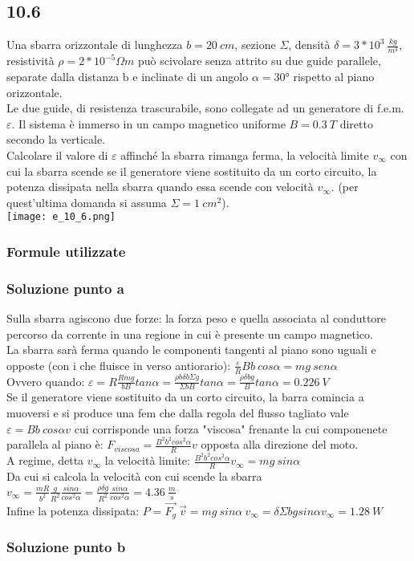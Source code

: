 \documentclass[../../main.tex]{subfiles}
\begin{document}
\subsection*{10.6}
Una sbarra orizzontale di lunghezza $b =20\ cm$, sezione $\Sigma$, densità $\delta = 3*10^3\ \frac{kg}{m^3}$, resistività $\rho = 2 * 10^{-5}\Omega m$ può scivolare senza attrito su due guide parallele, separate dalla distanza b e inclinate di un angolo $\alpha = 30°$ rispetto al piano orizzontale.\\
Le due guide, di resistenza trascurabile, sono collegate ad un generatore di f.e.m. $\varepsilon$. Il sistema è immerso in un campo magnetico uniforme $B = 0.3\ T$ diretto secondo la verticale.\\
Calcolare il valore di $\varepsilon$ affinché la sbarra rimanga ferma, la velocità limite $v_{\infty}$ con cui la sbarra scende se il generatore viene sostituito da un corto circuito, la potenza dissipata nella sbarra quando essa scende con velocità $v_{\infty}$. (per quest'ultima domanda si assuma $\Sigma = 1\ cm^2$).\\
\texttt{[image: e\_10\_6.png]}
\subsubsection*{Formule utilizzate}
\subsubsection*{Soluzione punto a}
Sulla sbarra agiscono due forze: la forza peso e quella associata al conduttore percorso da corrente in una regione in cui è presente un campo magnetico.\\
La sbarra sarà ferma quando le componenti tangenti al piano sono uguali e opposte (con i che fluisce in verso antiorario): $\frac{\varepsilon}{R}Bb\ cos\alpha = mg\ sen\alpha$\\
Ovvero quando: $\varepsilon = R\frac{Rmg}{bB}tan\alpha = \frac{\rho b \delta b\Sigma g}{\Sigma b B}tan\alpha = \frac{\rho \delta b g}{B}tan\alpha = 0.226\ V$\\
Se il generatore viene sostituito da un corto circuito, la barra comincia a muoversi e si produce una fem che dalla regola del flusso tagliato vale $\varepsilon = Bb\ cos\alpha v$ cui corrisponde una forza "viscosa" frenante la cui componenete parallela al piano è: $F_{viscosa} = \frac{B^2b^2cos^2\alpha}{R}v$ opposta alla direzione del moto.\\
A regime, detta $v_{\infty}$ la velocità limite: $\frac{B^2b^2cos^2\alpha}{R}v_\infty = mg\ sin\alpha$\\
Da cui si calcola la velocità con cui scende la sbarra $v_\infty = \frac{mR}{b^2}\frac{g}{R^2}\frac{sin\alpha}{cos^2\alpha} = \frac{\rho \delta g}{R^2}\frac{sin\alpha}{cos^2\alpha} = 4.36\ \frac{m}{s}$\\
Infine la potenza dissipata: $P = \vec{F_g}\ \vec{v} = mg\ sin\alpha\ v_\infty = \delta \Sigma b g sin\alpha v_\infty = 1.28\ W$
\subsubsection*{Soluzione punto b}
\newpage
\end{document}
